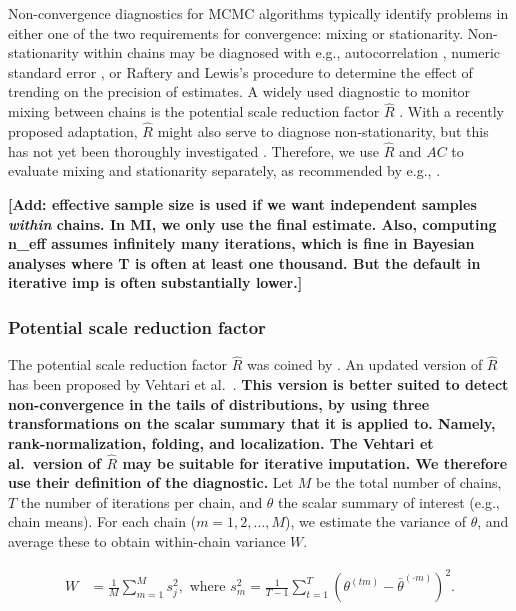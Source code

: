 \documentclass[Royal,times,sageh]{sagej}
\begin{document}
Non-convergence diagnostics for MCMC algorithms typically identify problems in either one of the two requirements for convergence: mixing or stationarity. Non-stationarity within chains may be diagnosed with e.g., autocorrelation \citep[\(AC\);][]{scha97, gelm13}, numeric standard error \citep[`MC error';][]{gewe92}, or Raftery and Lewis's \citeyearpar{raft91} procedure to determine the effect of trending on the precision of estimates. A widely used diagnostic to monitor mixing between chains is the potential scale reduction factor \(\widehat{R}\) \citep[`Gelman-Rubin statistic';][]{gelm92}. With a recently proposed adaptation, \(\widehat{R}\) might also serve to diagnose non-stationarity, but this has not yet been thoroughly investigated \citep{veht19}. Therefore, we use \(\widehat{R}\) and \(AC\) to evaluate mixing and stationarity separately, as recommended by e.g., \citet{cowl96}.

\textbf{{[}Add: effective sample size is used if we want independent samples \emph{within} chains. In MI, we only use the final estimate. Also, computing n\_eff assumes infinitely many iterations, which is fine in Bayesian analyses where T is often at least one thousand. But the default in iterative imp is often substantially lower.{]}}

\hypertarget{potential-scale-reduction-factor}{%
\subsubsection{Potential scale reduction factor}\label{potential-scale-reduction-factor}}

The potential scale reduction factor \(\widehat{R}\) was coined by \citet{gelm92}. An updated version of \(\widehat{R}\) has been proposed by Vehtari et al.~\citeyearpar[p.~5]{veht19}. \textbf{This version is better suited to detect non-convergence in the tails of distributions, by using three transformations on the scalar summary that it is applied to. Namely, rank-normalization, folding, and localization. The Vehtari et al.~version of \(\widehat{R}\) may be suitable for iterative imputation. We therefore use their definition of the diagnostic.} Let \(M\) be the total number of chains, \(T\) the number of iterations per chain, and \(\theta\) the scalar summary of interest (e.g., chain means). For each chain (\(m = 1, 2, \dots, M\)), we estimate the variance of \(\theta\), and average these to obtain within-chain variance \(W\).

\begin{align*}
W&=\frac{1}{M} \sum_{m=1}^{M} s_{j}^{2}, \text { where } s_{m}^{2}=\frac{1}{T-1} \sum_{t=1}^{T}\left(\theta^{(t m)}-\bar{\theta}^{(\cdot m)}\right)^{2}. 
\end{align*}
\end{document}
